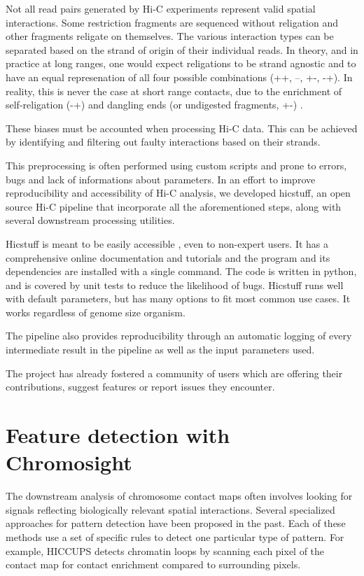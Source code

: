 Not all read pairs generated by Hi-C experiments represent valid spatial interactions. Some restriction fragments are sequenced without religation and other fragments religate on themselves. The various interaction types can be separated based on the strand of origin of their individual reads. In theory, and in practice at long ranges, one would expect religations to be strand agnostic and to have an equal represenation of all four possible combinations (++, --, +-, -+). In reality, this is never the case at short range contacts, due to the enrichment of self-religation (-+) and dangling ends (or undigested fragments, +-) \cite{cournacNormalizationChromosomalContact2012}.

These biases must be accounted when processing Hi-C data. This can be achieved by identifying and filtering out faulty interactions based on their strands.

This preprocessing is often performed using custom scripts and prone to errors, bugs and lack of informations about parameters. In an effort to improve reproducibility and accessibility of Hi-C analysis, we developed hicstuff, an open source Hi-C pipeline that incorporate all the aforementioned steps, along with several downstream processing utilities.

Hicstuff is meant to be easily accessible \cite{matthey-doretSimpleLibraryPipeline2021}, even to non-expert users. It has a comprehensive online documentation and tutorials and the program and its dependencies are installed with a single command. The code is written in python, and is covered by unit tests to reduce the likelihood of bugs. Hicstuff runs well with default parameters, but has many options to fit most common use cases. It works regardless of genome size organism.

The pipeline also provides reproducibility through an automatic logging of every intermediate result in the pipeline as well as the input parameters used.

The project has already fostered a community of users which are offering their contributions, suggest features or report issues they encounter.

\section{Feature detection with Chromosight}

The downstream analysis of chromosome contact maps often involves looking for signals reflecting biologically relevant spatial interactions. Several specialized approaches for pattern detection have been proposed in the past. Each of these methods use a set of specific rules to detect one particular type of pattern. For example, HICCUPS \cite{rao3DMapHuman2014} detects chromatin loops by scanning each pixel of the contact map for contact enrichment compared to surrounding pixels.

